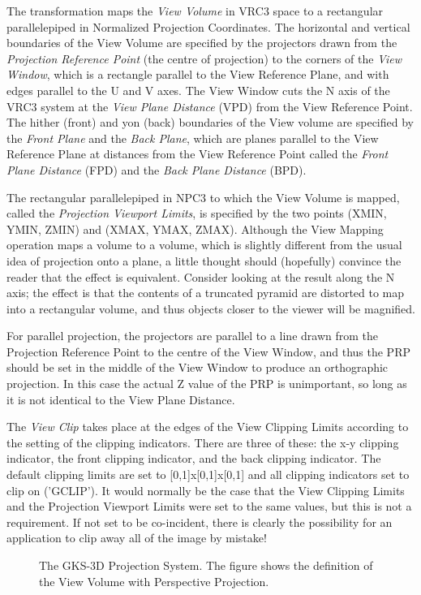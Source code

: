 The transformation maps the {\it View Volume} in VRC3 space to a
rectangular parallelepiped in Normalized Projection Coordinates.
The horizontal and vertical boundaries of the View Volume are specified
by the projectors drawn from the {\it Projection Reference Point}
(the centre of projection) to the corners of the {\it View Window},
which is a rectangle parallel to the View Reference Plane,
and with edges parallel to the U and V axes.
The View Window cuts the N axis of the VRC3 system at the
{\it View Plane Distance} (VPD) from the View Reference Point.
The hither (front) and yon (back) boundaries of the View volume are
specified by the {\it Front Plane} and the {\it Back
Plane}, which are planes parallel to the View Reference Plane at
distances from the View Reference Point called the {\it Front Plane
Distance} (FPD) and the {\it Back Plane Distance} (BPD).
 
The rectangular parallelepiped in NPC3 to which the View Volume is
mapped, called the {\it Projection Viewport Limits}, is
specified by the two points (XMIN, YMIN, ZMIN) and (XMAX, YMAX, ZMAX).
Although the View Mapping operation maps a volume to a volume,
which is slightly different from the usual idea of projection onto a plane,
a little thought should (hopefully) convince the reader that the effect is
equivalent. Consider looking at the result along the N axis; the effect is
that the contents of a truncated pyramid are distorted to map into a
rectangular volume, and thus objects closer to the viewer will be magnified.
 
For parallel projection, the projectors are parallel to a line drawn from
the Projection Reference Point to the centre of the View Window,
and thus the PRP should be set in the middle of the View Window
to produce an orthographic projection.
In this case the actual Z value of the PRP is unimportant, so long as it is
not identical to the View Plane Distance.
 
The {\it View Clip} takes place at the edges of the View
Clipping Limits according to the setting of the clipping indicators.
There are three of these: the x-y clipping indicator, the front clipping
indicator, and the back clipping indicator.
The default clipping limits are set to
[0,1]x[0,1]x[0,1] and all clipping indicators set to clip on ('GCLIP').
It would normally be the case that the View Clipping Limits and the
Projection Viewport Limits were set to the same values, but this is
not a requirement. If not set to be co-incident, there is clearly the
possibility for an application to clip away all of the image by mistake!
\begin{figure}[h]
\caption[The GKS-3D Projection System]%
        {The GKS-3D Projection System.
The figure shows the definition of the View Volume with
Perspective Projection.
}
\label{fig:proj}
\end{figure}
